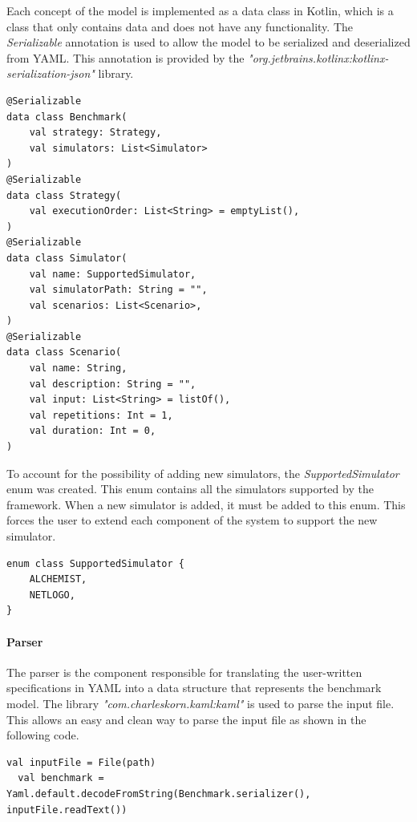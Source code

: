 \documentclass[12pt,a4paper,openright,twoside]{book}
\begin{document}
Each concept of the model is implemented as a data class in Kotlin, which is a class that only contains data and does not have any functionality.
The \emph{Serializable} annotation is used to allow the model to be serialized and deserialized from YAML.
This annotation is provided by the \emph{"org.jetbrains.kotlinx:kotlinx-serialization-json"} library.

\begin{lstlisting}[style=my-kotlin, language=my-kotlin, caption={Benchmark model.}]
@Serializable
data class Benchmark(
    val strategy: Strategy,
    val simulators: List<Simulator>
)
@Serializable
data class Strategy(
    val executionOrder: List<String> = emptyList(),
)
@Serializable
data class Simulator(
    val name: SupportedSimulator,
    val simulatorPath: String = "",
    val scenarios: List<Scenario>,
)
@Serializable
data class Scenario(
    val name: String,
    val description: String = "",
    val input: List<String> = listOf(),
    val repetitions: Int = 1,
    val duration: Int = 0,
)
\end{lstlisting}

To account for the possibility of adding new simulators, the \emph{SupportedSimulator} enum was created.
This enum contains all the simulators supported by the framework. When a new simulator is added, it must be added to this enum.
This forces the user to extend each component of the system to support the new simulator.

\begin{lstlisting}[style=my-kotlin, language=my-kotlin, caption={SupportedSimulator enum}]
  enum class SupportedSimulator {
    ALCHEMIST,
    NETLOGO,
}
\end{lstlisting}

\paragraph*{Parser}
The parser is the component responsible for translating the user-written specifications in YAML into a data structure that represents the benchmark model.
The library \emph{"com.charleskorn.kaml:kaml"} is used to parse the input file.
This allows an easy and clean way to parse the input file as shown in the following code.

\begin{lstlisting}[style=my-kotlin, language=my-kotlin, caption={Parsing of the input file}]
  val inputFile = File(path)
  val benchmark = Yaml.default.decodeFromString(Benchmark.serializer(), inputFile.readText())
\end{lstlisting}
\end{document}
